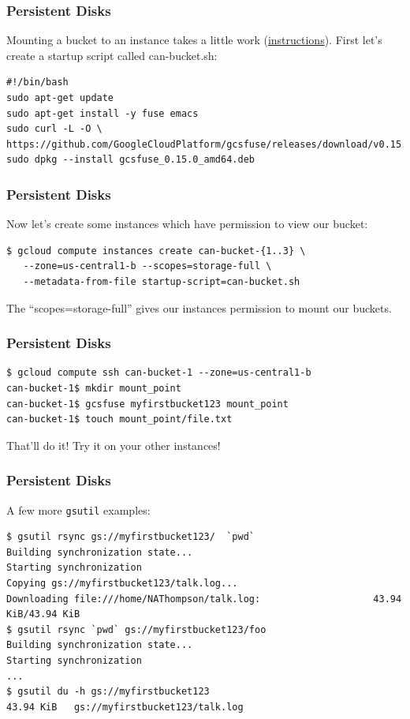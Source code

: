 \documentclass[9pt]{beamer}
\begin{document}
\begin{frame}[fragile]
\frametitle{Persistent Disks}
Mounting a bucket to an instance takes a little work (\href{https://github.com/googlecloudplatform/gcsfuse/blob/master/docs/installing.md}{instructions}). First let's create a startup script called can-bucket.sh:
\begin{verbatim}
#!/bin/bash
sudo apt-get update
sudo apt-get install -y fuse emacs
sudo curl -L -O \
https://github.com/GoogleCloudPlatform/gcsfuse/releases/download/v0.15.0/gcsfuse_0.15.0_amd64.deb
sudo dpkg --install gcsfuse_0.15.0_amd64.deb
\end{verbatim}
\end{frame}
\begin{frame}[fragile]
\frametitle{Persistent Disks}
Now let's create some instances which have permission to view our bucket:
\begin{verbatim}
$ gcloud compute instances create can-bucket-{1..3} \
   --zone=us-central1-b --scopes=storage-full \
   --metadata-from-file startup-script=can-bucket.sh
\end{verbatim}
The ``scopes=storage-full'' gives our instances permission to mount our buckets.
\end{frame}

\begin{frame}[fragile]
\frametitle{Persistent Disks}
\begin{verbatim} 
$ gcloud compute ssh can-bucket-1 --zone=us-central1-b
can-bucket-1$ mkdir mount_point
can-bucket-1$ gcsfuse myfirstbucket123 mount_point
can-bucket-1$ touch mount_point/file.txt
\end{verbatim}
That'll do it! Try it on your other instances!
\end{frame}

\begin{frame}[fragile]
  \frametitle{Persistent Disks}
  A few more \texttt{gsutil} examples:
  \begin{verbatim}
$ gsutil rsync gs://myfirstbucket123/  `pwd`
Building synchronization state...
Starting synchronization
Copying gs://myfirstbucket123/talk.log...
Downloading file:///home/NAThompson/talk.log:                    43.94 KiB/43.94 KiB
$ gsutil rsync `pwd` gs://myfirstbucket123/foo
Building synchronization state...
Starting synchronization
...
$ gsutil du -h gs://myfirstbucket123
43.94 KiB   gs://myfirstbucket123/talk.log
  \end{verbatim}
\end{frame}
\end{document}
